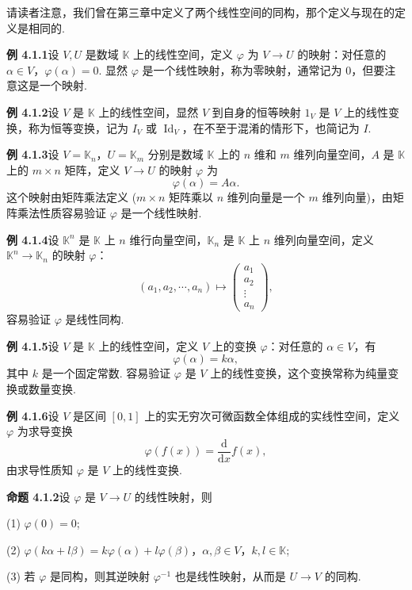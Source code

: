 \documentclass[UTF8, 12pt, fontset=fandol, oneside]{ctexart}
\begin{document}
请读者注意，我们曾在第三章中定义了两个线性空间的同构，那个定义与现在的定义是相同的.

\noindent\textbf{例 4.1.1}\quad 设 $V,U$ 是数域 $\mathbb{K}$ 上的线性空间，定义 $\varphi$ 为 $V\to U$ 的映射：对任意的 $\alpha\in V$，$\varphi(\alpha)=0$. 显然 $\varphi$ 是一个线性映射，称为零映射，通常记为 0，但要注意这是一个映射.

\noindent\textbf{例 4.1.2}\quad 设 $V$ 是 $\mathbb{K}$ 上的线性空间，显然 $V$ 到自身的恒等映射 $1_V$ 是 $V$ 上的线性变换，称为恒等变换，记为 $I_V$ 或 $\operatorname{Id}_V$，在不至于混淆的情形下，也简记为 $I$.

\noindent\textbf{例 4.1.3}\quad 设 $V=\mathbb{K}_n$，$U=\mathbb{K}_m$ 分别是数域 $\mathbb{K}$ 上的 $n$ 维和 $m$ 维列向量空间，$A$ 是 $\mathbb{K}$ 上的 $m\times n$ 矩阵，定义 $V\to U$ 的映射 $\varphi$ 为
\[
\varphi(\alpha)=A\alpha.
\]
这个映射由矩阵乘法定义 ($m\times n$ 矩阵乘以 $n$ 维列向量是一个 $m$ 维列向量)，由矩阵乘法性质容易验证 $\varphi$ 是一个线性映射.

\noindent\textbf{例 4.1.4}\quad 设 $\mathbb{K}^n$ 是 $\mathbb{K}$ 上 $n$ 维行向量空间，$\mathbb{K}_n$ 是 $\mathbb{K}$ 上 $n$ 维列向量空间，定义 $\mathbb{K}^n\to\mathbb{K}_n$ 的映射 $\varphi$：
\[
(a_1,a_2,\cdots,a_n)\mapsto
\left(\begin{array}{c}
a_1\\
a_2\\
\vdots\\
a_n
\end{array}\right),
\]
容易验证 $\varphi$ 是线性同构.

\noindent\textbf{例 4.1.5}\quad 设 $V$ 是 $\mathbb{K}$ 上的线性空间，定义 $V$ 上的变换 $\varphi$：对任意的 $\alpha\in V$，有
\[
\varphi(\alpha)=k\alpha,
\]
其中 $k$ 是一个固定常数. 容易验证 $\varphi$ 是 $V$ 上的线性变换，这个变换常称为纯量变换或数量变换.

\noindent\textbf{例 4.1.6}\quad 设 $V$ 是区间 $[0,1]$ 上的实无穷次可微函数全体组成的实线性空间，定义 $\varphi$ 为求导变换
\[
\varphi(f(x))=\frac{\mathrm{d}}{\mathrm{d}x}f(x),
\]
由求导性质知 $\varphi$ 是 $V$ 上的线性变换.

\noindent\textbf{命题 4.1.2}\quad 设 $\varphi$ 是 $V\to U$ 的线性映射，则

(1) $\varphi(0)=0$;

(2) $\varphi(k\alpha+l\beta)=k\varphi(\alpha)+l\varphi(\beta)$，$\alpha,\beta\in V$，$k,l\in\mathbb{K}$;

(3) 若 $\varphi$ 是同构，则其逆映射 $\varphi^{-1}$ 也是线性映射，从而是 $U\to V$ 的同构.
\end{document}
